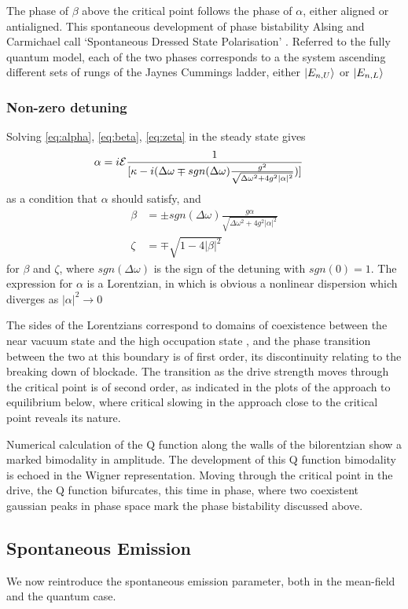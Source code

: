 The phase of $\beta$ above the critical point follows the phase of $\alpha$, either aligned or antialigned. This spontaneous development of phase bistability Alsing and Carmichael call `Spontaneous Dressed State Polarisation' \cite{Alsing1990}. Referred to the fully quantum model, each of the two phases corresponds to a the system ascending different sets of rungs of the Jaynes Cummings ladder, either $| E_{n, U} \rangle$ or $| E_{n, L} \rangle$
\subsubsection{Non-zero detuning}
Solving \cref{eq:alpha}, \cref{eq:beta}, \cref{eq:zeta} in the steady state gives
\begin{align}
  \alpha& = i \mathcal{E}\frac{1}{[\kappa-i(\Delta \omega \mp sgn(\Delta \omega) \frac{g^2}{\sqrt{\Delta \omega^2 +4g^2 |\alpha|^2}})]}
\end{align}
as a condition that $\alpha$ should satisfy, and
\begin{align}
  \beta& = \pm sgn(\Delta \omega) \frac{g \alpha}{\sqrt{\Delta \omega^2 + 4 g^2 |\alpha|^2}}\\
  \zeta& = \mp \sqrt{1-4|\beta|^2}
\end{align}
for $\beta$ and $\zeta$, where $sgn(\Delta \omega)$ is the sign of the detuning with $sgn(0) = 1$.
The expression for $\alpha$ is a Lorentzian, in which is obvious a nonlinear dispersion which diverges as $|\alpha|^2 \rightarrow 0$

The sides of the Lorentzians correspond to domains of coexistence between the near vacuum state and the high occupation state \cite{Carmichael2015}, and the phase transition between the two at this boundary is of first order, its discontinuity relating to the breaking down of blockade. The transition as the drive strength moves through the critical point is of second order, as indicated in the plots of the approach to equilibrium below, where critical slowing in the approach close to the critical point reveals its nature.

Numerical calculation of the Q function along the walls of the bilorentzian show a marked bimodality in amplitude. The development of this Q function bimodality is echoed in the Wigner representation. Moving through the critical point in the drive, the Q function bifurcates, this time in phase, where two coexistent gaussian peaks in phase space mark the phase bistability discussed above.
\subsection{Spontaneous Emission}
We now reintroduce the spontaneous emission parameter, both in the mean-field and the quantum case. 

